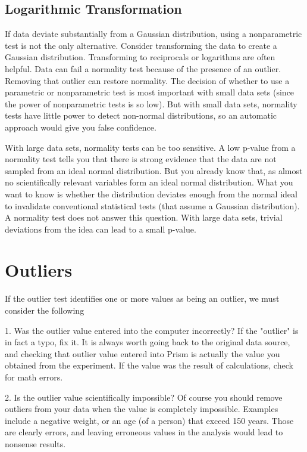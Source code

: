 \documentclass[a4paper,12pt]{article}
\begin{document}
\subsection{Logarithmic  Transformation}

If data deviate substantially from a Gaussian distribution, using a nonparametric test is not the only alternative. Consider transforming the data to create a Gaussian distribution. Transforming to reciprocals or logarithms are often helpful.
Data can fail a normality test because of the presence of an outlier. Removing that outlier can restore normality.
The decision of whether to use a parametric or nonparametric test is most important with small data sets (since the power of nonparametric tests is so low). But with small data sets, normality tests have little power to detect non-normal distributions, so an automatic approach would give you false confidence.

With large data sets, normality tests can be too sensitive. A low p-value from a normality test tells you that there is strong evidence that the data are not sampled from an ideal normal distribution. But you already know that, as almost no scientifically relevant variables form an ideal normal distribution. What you want to know is whether the distribution deviates enough from the normal ideal to invalidate conventional statistical tests (that assume a Gaussian distribution). A normality test does not answer this question. With large data sets, trivial deviations from the idea can lead to a small p-value.

\section{Outliers}
If the outlier test identifies one or more values as being an outlier, we must consider the following

1.	Was the outlier value entered into the computer incorrectly?
If the "outlier" is in fact a typo, fix it. It is always worth going back to the original data source, and checking that outlier value entered into Prism is actually the value you obtained from the experiment. If the value was the result of calculations, check for math errors.

2.	Is the outlier value scientifically impossible?
Of course you should remove outliers from your data when the value is completely impossible. Examples include a negative weight, or an age (of a person) that exceed 150 years. Those are clearly errors, and leaving erroneous values in the analysis would lead to nonsense results.
\end{document}
